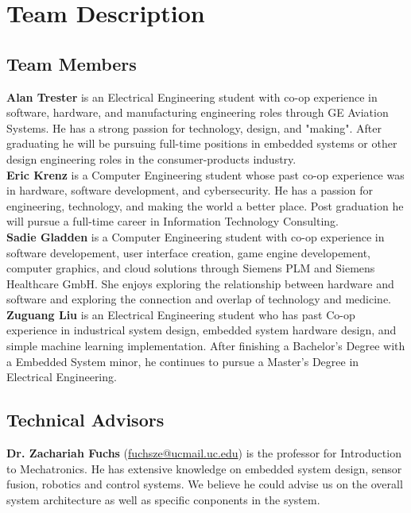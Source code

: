 \chapter{Team Description}

\section{Team Members}
	
	\textbf{Alan Trester} is an Electrical Engineering student with co-op experience in software, hardware, and manufacturing engineering roles through GE Aviation Systems. He has a strong passion for technology, design, and "making". After graduating he will be pursuing full-time positions in embedded systems or other design engineering roles in the consumer-products industry.\\
	
	\textbf{Eric Krenz} is a Computer Engineering student whose past co-op experience was in hardware, software development, and cybersecurity. He has a passion for engineering, technology, and making the world a better place. Post graduation he will pursue a full-time career in Information Technology Consulting. \\
	
	\textbf{Sadie Gladden } is a Computer Engineering student with co-op experience in software developement, user interface creation, game engine developement, computer graphics, and cloud solutions through Siemens PLM and Siemens Healthcare GmbH. She enjoys exploring the relationship between hardware and software and exploring the connection and overlap of technology and medicine.\\
	
	\textbf{Zuguang Liu} is an Electrical Engineering student who has past Co-op experience in industrical system design, embedded system hardware design, and simple machine learning implementation. After finishing a Bachelor's Degree with a Embedded System minor, he continues to pursue a Master's Degree in Electrical Engineering. 
	
\section{Technical Advisors} 
	
	\textbf{Dr. Zachariah Fuchs} (\href{fuchsze@ucmail.uc.edu}{fuchsze@ucmail.uc.edu}) is the professor for Introduction to Mechatronics. He has extensive knowledge on embedded system design, sensor fusion, robotics and control systems. We believe he could advise us on the overall system architecture as well as specific conponents in the system. \\
	
